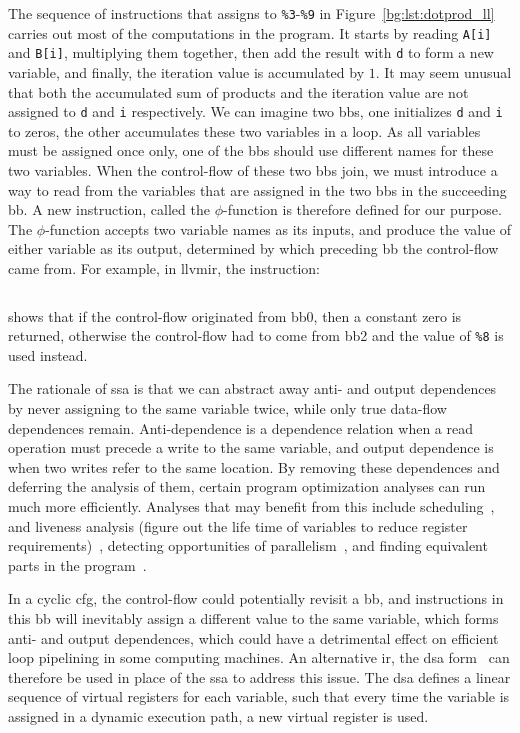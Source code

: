 The sequence of instructions that assigns to \verb|%3|-\verb|%9| in
Figure~\ref{bg:lst:dotprod_ll} carries out most of the computations in the
program.  It starts by reading \verb|A[i]| and \verb|B[i]|, multiplying them
together, then add the result with \verb|d| to form a new variable, and
finally, the iteration value is accumulated by $1$.  It may seem unusual that
both the accumulated sum of products and the iteration value are not assigned
to \verb|d| and \verb|i| respectively.  We can imagine two \glspl{bb}, one
initializes \verb|d| and \verb|i| to zeros, the other accumulates these two
variables in a loop.  As all variables must be assigned once only, one of
the \glspl{bb} should use different names for these two variables.  When the
control-flow of these two \glspl{bb} join, we must introduce a way to read
from the variables that are assigned in the two \glspl{bb} in the succeeding
\gls{bb}\@.  A new instruction, called the $\phi$-function is therefore defined
for our purpose.  The $\phi$-function accepts two variable names as its inputs,
and produce the value of either variable as its output, determined by which
preceding \gls{bb} the control-flow came from.  For example, in \gls{llvmir},
the instruction:
\begin{lstlisting}[language=LLVM]
    %d.01 = phi float [ 0.000000e+00, %0 ], [ %8, %2 ]
\end{lstlisting}\vspace{-15pt}
shows that if the control-flow originated from \gls{bb}0, then a constant zero
is returned, otherwise the control-flow had to come from \gls{bb}2 and the
value of \verb|%8| is used instead.

The rationale of \gls{ssa} is that we can abstract away anti- and output
dependences by never assigning to the same variable twice, while only true
data-flow dependences remain.  Anti-dependence is a dependence relation when a
read operation must precede a write to the same variable, and output dependence
is when two writes refer to the same location.  By removing these dependences
and deferring the analysis of them, certain program optimization analyses
can run much more efficiently.  Analyses that may benefit from this include
scheduling~\cite{rau94}, and liveness analysis (figure out the life time
of variables to reduce register requirements)~\cite{cytron91}, detecting
opportunities of parallelism~\cite{cytron87}, and finding equivalent parts in
the program~\cite{alpern88}.

In a cyclic \gls{cfg}, the control-flow could potentially revisit a \gls{bb},
and instructions in this \gls{bb} will inevitably assign a different value to
the same variable, which forms anti- and output dependences, which could have
a detrimental effect on efficient loop pipelining in some computing machines.
An alternative \gls{ir}, the \gls{dsa} form~\cite{rau92} can therefore be used
in place of the \gls{ssa} to address this issue.  The \gls{dsa} defines a
linear sequence of virtual registers for each variable, such that every time
the variable is assigned in a dynamic execution path, a new virtual register is
used.

